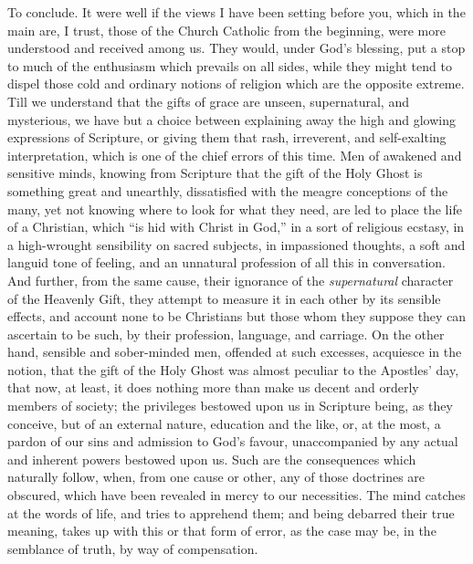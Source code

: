 To conclude. It were well if the views I have been setting before
you, which in the main are, I trust, those of the Church Catholic from
the beginning, were more understood and received among us. They would,
under God's blessing, put a stop to much of the enthusiasm which
prevails on all sides, while they might tend to dispel those cold and
ordinary notions of religion which are the opposite extreme. Till we
understand that the gifts of grace are unseen, supernatural, and
mysterious, we have but a choice between explaining away the high and
glowing expressions of Scripture, or giving them that rash,
irreverent, and self-exalting interpretation, which is one of the
chief errors of this time. Men of awakened and sensitive minds,
knowing from Scripture that the gift of the Holy Ghost is something
great and unearthly, dissatisfied with the meagre conceptions of the
many, yet not knowing where to look for what they need, are led to
place the life of a Christian, which ``is hid with Christ in
God,'' in a sort of religious ecstasy, in a high-wrought
sensibility on sacred subjects, in impassioned thoughts, a soft and
languid tone of feeling, and an unnatural profession of all this in
conversation. And further, from the same cause, their ignorance of the
\emph{supernatural} character of the Heavenly Gift, they attempt to
measure it in each other by its sensible effects, and account none to
be Christians but those whom they suppose they can ascertain to be
such, by their profession, language, and carriage. On the other hand,
sensible and sober-minded men, offended at such excesses, acquiesce in
the notion, that the gift of the Holy Ghost was almost peculiar to the
Apostles' day, that now, at least, it does nothing more than make us
decent and orderly members of society; the privileges bestowed upon us
in Scripture being, as they conceive, but of an external nature,
education and the like, or, at the most, a pardon of our sins and
admission to God's favour, unaccompanied by any actual and inherent
powers bestowed upon us. Such are the consequences which naturally
follow, when, from one cause or other, any of those doctrines are
obscured, which have been revealed in mercy to our necessities. The
mind catches at the words of life, and tries to apprehend them; and
being debarred their true meaning, takes up with this or that form of
error, as the case may be, in the semblance of truth, by way of
compensation.

